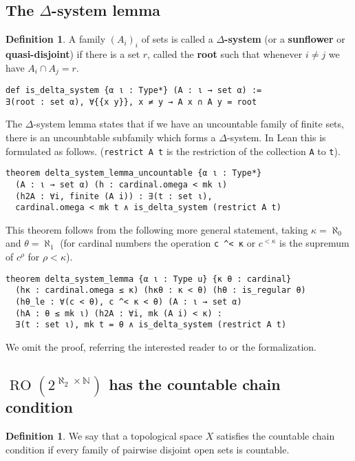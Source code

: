 \documentclass[a4paper,USenglish,cleveref, autoref]{lipics-v2019}
\theoremstyle{theorem}
\theoremstyle{definition}
\newtheorem{defn}[definition]{Definition}
\begin{document}
\subsection{The $\Delta$-system lemma}

\begin{defn}
  A family $(A_i)_i$ of sets is called a \textbf{$\Delta$-system} (or a \textbf{sunflower} or \textbf{quasi-disjoint}) if there is a set $r$, called the \textbf{root} such that whenever $i \ne j$ we have $A_i \cap A_j = r$.
\end{defn}
\begin{lstlisting}
def is_delta_system {α ι : Type*} (A : ι → set α) :=
∃(root : set α), ∀{{x y}}, x ≠ y → A x ∩ A y = root
\end{lstlisting}

The $\Delta$-system lemma states that if we have an uncountable family of finite sets, there is an uncounbtable subfamily which forms a $\Delta$-system.
In Lean this is formulated as follows. (\lstinline{restrict A t} is the restriction of the collection \lstinline{A} to \lstinline{t}).
\begin{lstlisting}
theorem delta_system_lemma_uncountable {α ι : Type*}
  (A : ι → set α) (h : cardinal.omega < mk ι)
  (h2A : ∀i, finite (A i)) : ∃(t : set ι),
  cardinal.omega < mk t ∧ is_delta_system (restrict A t)
\end{lstlisting}
This theorem follows from the following more general statement, taking $\kappa=\aleph_0$ and $\theta=\aleph_1$ (for cardinal numbers the operation \lstinline{c ^< κ} or $c^{<\kappa}$ is the supremum of $c^\rho$ for $\rho<\kappa$).
\begin{lstlisting}
theorem delta_system_lemma {α ι : Type u} {κ θ : cardinal}
  (hκ : cardinal.omega ≤ κ) (hκθ : κ < θ) (hθ : is_regular θ)
  (hθ_le : ∀(c < θ), c ^< κ < θ) (A : ι → set α)
  (hA : θ ≤ mk ι) (h2A : ∀i, mk (A i) < κ) :
  ∃(t : set ι), mk t = θ ∧ is_delta_system (restrict A t)
\end{lstlisting}

We omit the proof, referring the interested reader to \cite{kunen2014set} or the formalization.

\subsection{$\operatorname{RO}(2^{\aleph_2 \times \mathbb{N}})$ has the countable chain condition}

\begin{defn}
  We say that a topological space $X$ satisfies the countable chain condition if every family of pairwise disjoint open sets is countable.
\end{defn}
\end{document}
